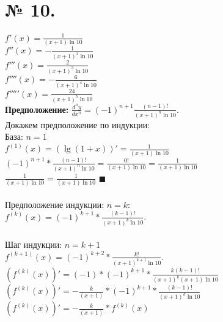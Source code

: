 \documentclass[a4paper,12pt]{report}
\begin{document}
\section{№ 10.}
$f'(x) = \frac{1}{(x + 1)\ln{10}}$\\
$f''(x) = -\frac{1}{(x + 1)^2\ln{10}}$\\
$f'''(x) = \frac{2}{(x + 1)^3\ln{10}}$\\
$f''''(x) = -\frac{6}{(x + 1)^4\ln{10}}$\\
$f'''''(x) = \frac{24}{(x + 1)^5\ln{10}}$\\
\textbf{Предположение:} $\frac{d^ny}{dx^n} = (-1)^{n + 1}\frac{(n - 1)!}{(x + 1)^n\ln{10}}$.\\
Докажем предположение по индукции:\\
База: $n = 1$\\
$f^{(1)}(x) = (\lg(1 + x))' = \frac{1}{(x + 1)\ln{10}}$\\
$(-1)^{n + 1} * \frac{(n - 1)!}{(x + 1)^n\ln{10}} = \frac{0!}{(x + 1)\ln{10}} = \frac{1}{(x + 1)\ln{10}}$\\
$\frac{1}{(x + 1)\ln{10}} = \frac{1}{(x + 1)\ln{10}}$ $ \blacksquare$\\
\\
Предположение индукции: $n = k$:\\
$f^{(k)}(x) = (-1)^{k + 1} * \frac{(k - 1)!}{(x + 1)^k\ln{10}}$.\\
\\
Шаг индукции: $n = k +1$\\
$f^{(k + 1)}(x) = (-1)^{k + 2} * \frac{k!}{(x + 1)^{k + 1}\ln{10}}$.\\
$(f^{(k)}(x))' = (-1) * (-1)^{k + 1} * \frac{k(k - 1)!}{(x + 1)^k(x + 1)\ln{10}}$\\
$(f^{(k)}(x))' = -\frac{k}{(x + 1)} * (-1)^{k + 1} * \frac{(k - 1)!}{(x + 1)^k\ln{10}}$\\
$(f^{(k)}(x))' = -\frac{k}{(x + 1)} * f^{(k)}(x)$\\
\end{document}
